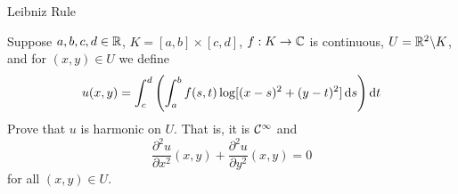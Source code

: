 \begin{section}{Leibniz Rule}

\begin{ex}
	Suppose $a,b,c,d \in \mathbb{R}$, $K = [a,b] \times [c,d]$,
	$f:K \rightarrow \mathbb{C}$ is continuous, $U = \mathbb{R}^2 
	\backslash K$, and for $(x,y) \in U$ we define
		\begin{displaymath}
			u(x,y) = \int_{c}^{d}{\left(\int_{a}^{b}{f(s,t)\log[(x-s)^2+(y-t)^2]}\, \mathrm{d}{s}\right)}\, \mathrm{d}{t}
		\end{displaymath}
	Prove that $u$ is harmonic on $U$. That is, it is $\mathcal{C}^{\infty}$
	and
		\begin{displaymath}
			\frac{\partial^2 u}{\partial x^2}(x,y) 
				+ \frac{\partial^2 u}{\partial y^2}(x,y) = 0
		\end{displaymath}
	for all $(x,y) \in U$.
\end{ex}


\end{section}
